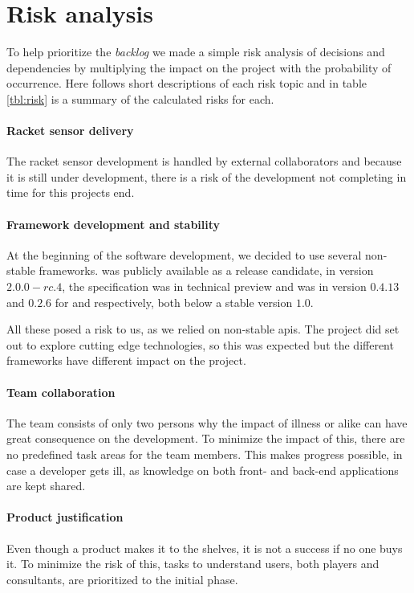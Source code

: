 \chapter{Risk analysis}
To help prioritize the \textit{backlog} we made a simple risk analysis of decisions and dependencies by multiplying the impact on the project with the probability of occurrence. Here follows short descriptions of each risk topic and in table \ref{tbl:risk} is a summary of the calculated risks for each.

\subsubsection*{Racket sensor delivery}
The racket sensor development is handled by external collaborators and because it is still under development, there is a risk of the development not completing in time for this projects end.

\subsubsection*{Framework development and stability}
At the beginning of the software development, we decided to use several non-stable frameworks.
 was publicly available as a release candidate, in version $2.0.0-rc.4$, the  specification was in technical preview and  was in version $0.4.13$ and $0.2.6$ for  and  respectively, both below a stable version $1.0$.

All these posed a risk to us, as we relied on non-stable \glspl{api}.
The project did set out to explore cutting edge technologies, so this was expected but the different frameworks have different impact on the project.

\subsubsection*{Team collaboration}
The team consists of only two persons why the impact of illness or alike can have great consequence on the development.
To minimize the impact of this, there are no predefined task areas for the team members.
This makes progress possible, in case a developer gets ill, as knowledge on both front- and back-end applications are kept shared.

\subsubsection*{Product justification}
Even though a product makes it to the shelves, it is not a success if no one buys it.
To minimize the risk of this, tasks to understand users, both players and consultants, are prioritized to the initial phase.

